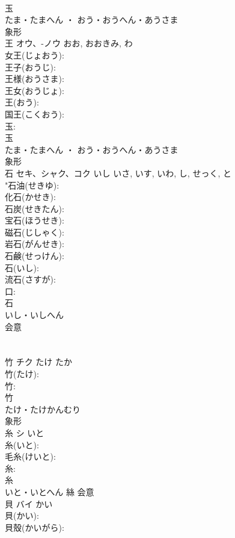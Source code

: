 \documentclass[8pt]{extreport}
\begin{document}
\begin{CJK}{UTF8}{min}
\\	玉	
\\	たま・たまへん ・ おう・おうへん・あうさま	
\\	象形 
\\	王	オウ、-ノウ		おお, おおきみ, わ	
\\	女王(じょおう): 
\\	王子(おうじ): 
\\	王様(おうさま): 
\\	王女(おうじょ): 
\\	王(おう): 
\\	国王(こくおう): 
\\	玉: 
\\	玉	
\\	たま・たまへん ・ おう・おうへん・あうさま	
\\	象形 
\\	石	セキ、シャク、コク	いし	いさ, いす, いわ, し, せっく, と	
\\	"石油(せきゆ): 
\\	化石(かせき): 
\\	石炭(せきたん): 
\\	宝石(ほうせき): 
\\	磁石(じしゃく): 
\\	岩石(がんせき): 
\\	石鹸(せっけん): 
\\	石(いし): 
\\	流石(さすが): 
\\	口: 
\\	石	
\\	いし・いしへん	
\\	会意 
\\	[いし] 
\\	[ほうせき] 
\\	竹	チク	たけ	たか	
\\	竹(たけ): 
\\	竹: 
\\	竹	
\\	たけ・たけかんむり	
\\	象形 
\\	糸	シ	いと		
\\	糸(いと): 
\\	毛糸(けいと): 
\\	糸: 
\\	糸	
\\	いと・いとへん	絲	会意 
\\	貝	バイ	かい		
\\	貝(かい): 
\\	貝殼(かいがら): 

\end{CJK}
\end{document}
